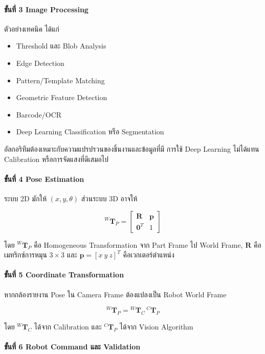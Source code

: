 \paragraph{ขั้นที่ 3 Image Processing}

ตัวอย่างเทคนิค ได้แก่

\begin{itemize}
    \item Threshold และ Blob Analysis
    \item Edge Detection
    \item Pattern/Template Matching
    \item Geometric Feature Detection
    \item Barcode/OCR
    \item Deep Learning Classification หรือ Segmentation
\end{itemize}

อัลกอริทึมต้องเหมาะกับความแปรปรวนของชิ้นงานและข้อมูลที่มี การใช้ Deep Learning ไม่ได้แทน Calibration หรือการจัดแสงที่ดีเสมอไป

\paragraph{ขั้นที่ 4 Pose Estimation}

ระบบ 2D มักให้ $(x,y,\theta)$ ส่วนระบบ 3D อาจให้

\[
{}^{W}\mathbf{T}_{P}=
\begin{bmatrix}
\mathbf{R} & \mathbf{p}\\
\mathbf{0}^{T} & 1
\end{bmatrix}
\]

โดย ${}^{W}\mathbf{T}_{P}$ คือ Homogeneous Transformation จาก Part Frame ไป World Frame, $\mathbf{R}$ คือเมทริกซ์การหมุน $3\times3$ และ $\mathbf{p}=[x\ y\ z]^T$ คือเวกเตอร์ตำแหน่ง

\paragraph{ขั้นที่ 5 Coordinate Transformation}

หากกล้องรายงาน Pose ใน Camera Frame ต้องแปลงเป็น Robot World Frame

\[
{}^{W}\mathbf{T}_{P}={}^{W}\mathbf{T}_{C}\,{}^{C}\mathbf{T}_{P}
\]

โดย ${}^{W}\mathbf{T}_{C}$ ได้จาก Calibration และ ${}^{C}\mathbf{T}_{P}$ ได้จาก Vision Algorithm

\paragraph{ขั้นที่ 6 Robot Command และ Validation}

